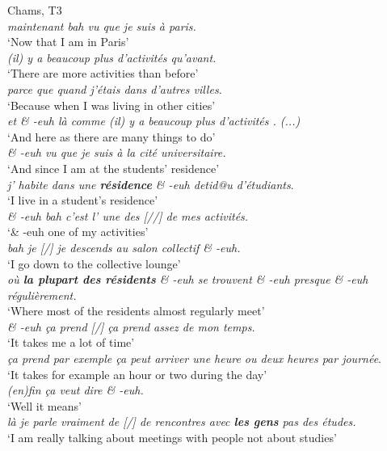 \documentclass[output=paper]{langscibook}
\begin{document}
\ea%
    \label{ex:9}
	Chams, T3\medskip\\
\textit{maintenant bah vu que je suis à paris.}\\
\glt `Now that I am in Paris'\\
\textit{(il) y a beaucoup plus d'activités qu'avant.}\\
\glt `There are more activities than before'\\
\textit{parce que quand j'étais dans d'autres villes.}\\
\glt `Because when I was living in other cities'
\\
\textit{et \& -euh là comme (il) y a beaucoup plus d'activités . (...)}\\
\glt `And here as there are many things to do'\\
\textit{\& -euh vu que je suis à la cité universitaire.}\\
\glt `And since I am at the students’ residence'\\
\textit{j' habite dans une \textbf{résidence} \& -euh detid@u d'étudiants}.\\
\glt `I live in a student’s residence'\\
\textit{\& -euh bah c'est l' une des [//] de mes activités.}\\
\glt `\& -euh one of my activities'\\
\textit{bah je [/] je descends au salon collectif \& -euh.}\\
\glt `I go down to the collective lounge'\\
\textit{où \textbf{la plupart des résidents} \& -euh se trouvent \& -euh presque \& -euh régulièrement.}\\
\glt `Where most of the residents almost regularly meet'\\
\textit{\& -euh ça prend [/] ça prend assez de mon temps.}\\
\glt `It takes me a lot of time'\\
\textit{ça prend par exemple ça peut arriver une heure ou deux heures par journée}.\\
\glt `It takes for example an hour or two during the day'\\
\textit{(en)fin ça veut dire \& -euh.}\\
\glt `Well it means'\\
\textit{là je parle vraiment de [/] de rencontres avec \textbf{les gens} pas des études.}\\
\glt `I am really talking about meetings with people not about studies'
\z
\end{document}
